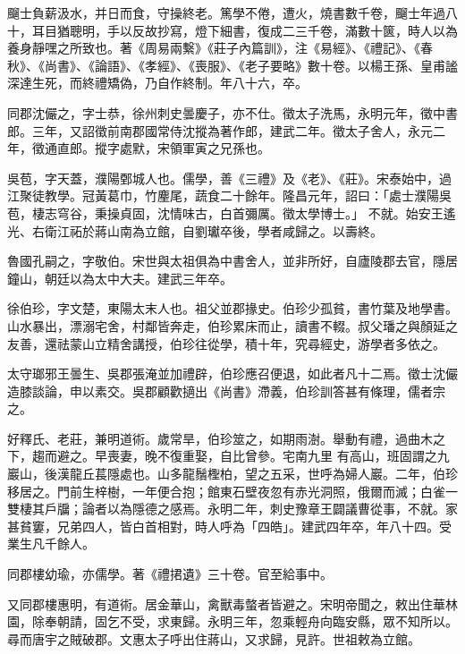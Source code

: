 \begin{pinyinscope}
 飀士負薪汲水，并日而食，守操終老。篤學不倦，遭火，燒書數千卷，飀士年過八十，耳目猶聰明，手以反故抄寫，燈下細書，復成二三千卷，滿數十篋，時人以為養身靜嘿之所致也。著《周易兩繫》《莊子內篇訓》，注《易經》、《禮記》、《春秋》、《尚書》、《論語》、《孝經》、《喪服》、《老子要略》數十卷。以楊王孫、皇甫謐深達生死，而終禮矯偽，乃自作終制。年八十六，卒。



 同郡沈儼之，字士恭，徐州刺史曇慶子，亦不仕。徵太子洗馬，永明元年，徵中書郎。三年，又詔徵前南郡國常侍沈摐為著作郎，建武二年。徵太子舍人，永元二年，徵通直郎。摐字處默，宋領軍寅之兄孫也。



 吳苞，字天蓋，濮陽鄄城人也。儒學，善《三禮》及《老》、《莊》。宋泰始中，過江聚徒教學。冠黃葛巾，竹麈尾，蔬食二十餘年。隆昌元年，詔曰：「處士濮陽吳苞，棲志穹谷，秉操貞固，沈情味古，白首彌厲。徵太學博士。」
 不就。始安王遙光、右衛江祏於蔣山南為立館，自劉瓛卒後，學者咸歸之。以壽終。



 魯國孔嗣之，字敬伯。宋世與太祖俱為中書舍人，並非所好，自廬陵郡去官，隱居鐘山，朝廷以為太中大夫。建武三年卒。



 徐伯珍，字文楚，東陽太末人也。祖父並郡掾史。伯珍少孤貧，書竹葉及地學書。山水暴出，漂溺宅舍，村鄰皆奔走，伯珍累床而止，讀書不輟。叔父璠之與顏延之友善，還祛蒙山立精舍講授，伯珍往從學，積十年，究尋經史，游學者多依之。



 太守瑯邪王曇生、吳郡張淹並加禮辟，伯珍應召便退，如此者凡十二焉。徵士沈儼造膝談論，申以素交。吳郡顧歡擿出《尚書》滯義，伯珍訓答甚有條理，儒者宗之。



 好釋氏、老莊，兼明道術。歲常旱，伯珍筮之，如期雨澍。舉動有禮，過曲木之下，趨而避之。早喪妻，晚不復重娶，自比曾參。宅南九里
 有高山，班固謂之九巖山，後漢龍丘萇隱處也。山多龍鬚檉柏，望之五采，世呼為婦人巖。二年，伯珍移居之。門前生梓樹，一年便合抱；館東石壁夜忽有赤光洞照，俄爾而滅；白雀一雙棲其戶牖；論者以為隱德之感焉。永明二年，刺史豫章王闢議曹從事，不就。家甚貧窶，兄弟四人，皆白首相對，時人呼為「四皓」。建武四年卒，年八十四。受業生凡千餘人。



 同郡樓幼瑜，亦儒學。著《禮捃遺》三十卷。官至給事中。



 又同郡樓惠明，有道術。居金華山，禽獸毒螫者皆避之。宋明帝聞之，敕出住華林園，除奉朝請，固乞不受，求東歸。永明三年，忽乘輕舟向臨安縣，眾不知所以。尋而唐宇之賊破郡。文惠太子呼出住蔣山，又求歸，見許。世祖敕為立館。




\end{pinyinscope}
